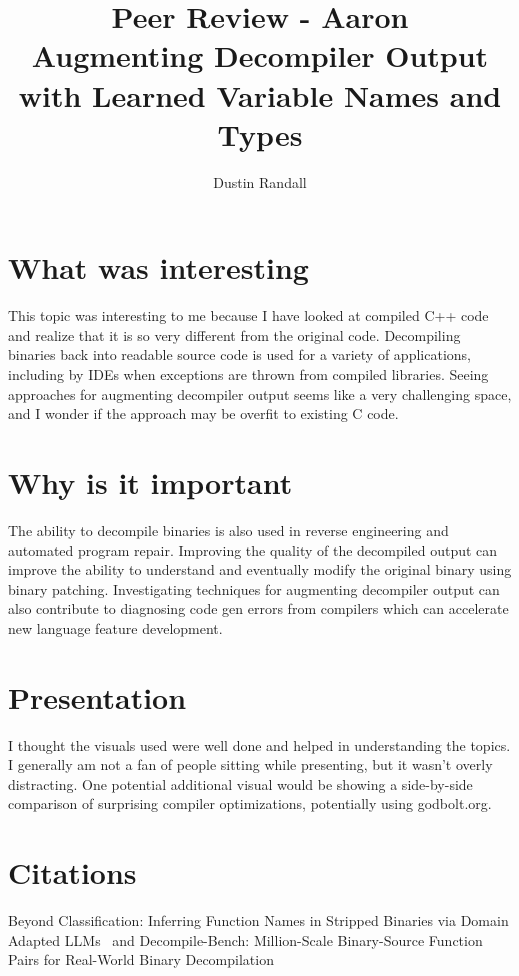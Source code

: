 \documentclass{article}
\begin{document}
\title{Peer Review - Aaron \\
Augmenting Decompiler Output with Learned Variable Names and Types}
\author{Dustin Randall}
\date{}
\maketitle

\section{What was interesting}
This topic was interesting to me because I have looked at compiled C++ code and realize that it is so very different from the original code.
Decompiling binaries back into readable source code is used for a variety of applications, including by IDEs when exceptions are thrown from compiled libraries.
Seeing approaches for augmenting decompiler output seems like a very challenging space, and I wonder if the approach may be overfit to existing C code.

\section{Why is it important}
The ability to decompile binaries is also used in reverse engineering and automated program repair.
Improving the quality of the decompiled output can improve the ability to understand and eventually modify the original binary using binary patching.
Investigating techniques for augmenting decompiler output can also contribute to diagnosing code gen errors from compilers which can accelerate new language feature development.

\section{Presentation}
I thought the visuals used were well done and helped in understanding the topics.
I generally am not a fan of people sitting while presenting, but it wasn't overly distracting.
One potential additional visual would be showing a side-by-side comparison of surprising compiler optimizations, potentially using godbolt.org.

\section{Citations}
Beyond {Classification}: {Inferring} {Function} {Names} in {Stripped} {Binaries} via {Domain} {Adapted} {LLMs}~\cite{jiang_beyond_2025}
and Decompile-{Bench}: {Million}-{Scale} {Binary}-{Source} {Function} {Pairs} for {Real}-{World} {Binary} {Decompilation}~\cite{tan_decompile-bench_2025}



\end{document}
